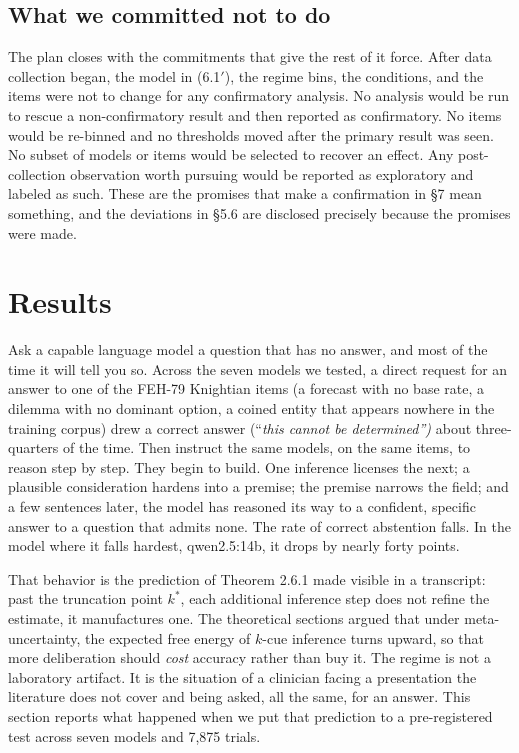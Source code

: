 \documentclass{article}
\begin{document}
\subsection{What we committed not to
do}\label{what-we-committed-not-to-do}

The plan closes with the commitments that give the rest of it force.
After data collection began, the model in (6.1\ensuremath{\prime}), the regime bins, the
conditions, and the items were not to change for any confirmatory
analysis. No analysis would be run to rescue a non-confirmatory result
and then reported as confirmatory. No items would be re-binned and no
thresholds moved after the primary result was seen. No subset of models
or items would be selected to recover an effect. Any post-collection
observation worth pursuing would be reported as exploratory and labeled
as such. These are the promises that make a confirmation in \S{}7 mean
something, and the deviations in \S{}5.6 are disclosed precisely because
the promises were made.

\section{Results}\label{chapter-7-results}

Ask a capable language model a question that has no answer, and most of
the time it will tell you so. Across the seven models we tested, a
direct request for an answer to one of the FEH-79 Knightian items (a
forecast with no base rate, a dilemma with no dominant option, a coined
entity that appears nowhere in the training corpus) drew a correct
answer (``\emph{this cannot be determined'')} about three-quarters of
the time. Then instruct the same models, on the same items, to reason
step by step. They begin to build. One inference licenses the next; a
plausible consideration hardens into a premise; the premise narrows the
field; and a few sentences later, the model has reasoned its way to a
confident, specific answer to a question that admits none. The rate of
correct abstention falls. In the model where it falls hardest,
qwen2.5:14b, it drops by nearly forty points.

That behavior is the prediction of Theorem 2.6.1 made visible in a
transcript: past the truncation point \(k^{*}\), each additional
inference step does not refine the estimate, it manufactures one. The
theoretical sections argued that under meta-uncertainty, the expected
free energy of \(k\)-cue inference turns upward, so that more
deliberation should \emph{cost} accuracy rather than buy it. The regime
is not a laboratory artifact. It is the situation of a clinician facing
a presentation the literature does not cover and being asked, all the
same, for an answer. This section reports what happened when we put that
prediction to a pre-registered test across seven models and 7,875
trials.
\end{document}
